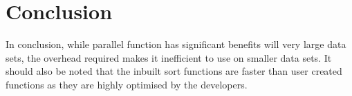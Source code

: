 \section{Conclusion}
In conclusion, while parallel function has significant benefits will very large data sets, the overhead required makes it inefficient to use on smaller data sets.
It should also be noted that the inbuilt sort functions are faster than user created functions as they are highly optimised by the developers.